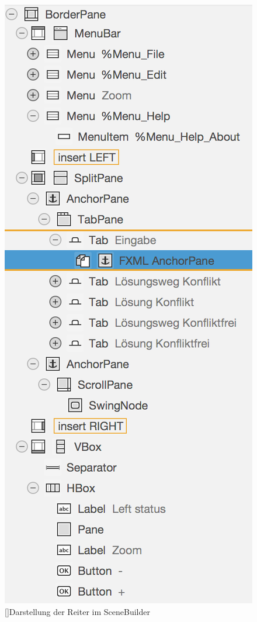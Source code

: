 \documentclass[12pt,a4paper, listof=entryprefix, bibliography=totocnumbered,toc=listofnumbered,lof=listofnumbered]{scrartcl}
\begin{document}
\begin{figure}[H]
	\centering
	\includegraphics[]{Bilder/tabs.png} 
	[]{Darstellung der Reiter im SceneBuilder}
	\label{fig:osgi}
\end{figure}
\end{document}
